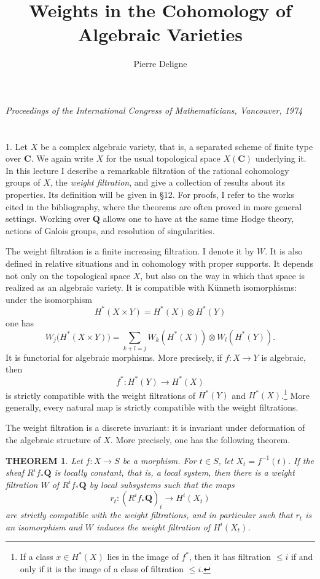 \documentclass[10pt]{amsart}
\title{Weights in the Cohomology of Algebraic Varieties}
\author{Pierre Deligne}
\theoremstyle{plain}
\newtheorem{theorem}{THEOREM}
\theoremstyle{definition}
\theoremstyle{remark}
\begin{document}
\maketitle

\begin{center}
\textit{Proceedings of the International Congress of Mathematicians, Vancouver, 1974}
\end{center}

\section*{}

1. Let $X$ be a complex algebraic variety, that is, a separated scheme of finite type over $\mathbf C$. We again write $X$ for the usual topological space $X(\mathbf C)$ underlying it. In this lecture I describe a remarkable filtration of the rational cohomology groups of $X$, the \textit{weight filtration}, and give a collection of results about its properties. Its definition will be given in \S 12. For proofs, I refer to the works cited in the bibliography, where the theorems are often proved in more general settings. Working over $\mathbf Q$ allows one to have at the same time Hodge theory, actions of Galois groups, and resolution of singularities.

The weight filtration is a finite increasing filtration. I denote it by $W$. It is also defined in relative situations and in cohomology with proper supports. It depends not only on the topological space $X$, but also on the way in which that space is realized as an algebraic variety. It is compatible with Künneth isomorphisms: under the isomorphism
\[
H^*(X\times Y)=H^*(X)\otimes H^*(Y)
\]
one has
\[
W_j\bigl(H^*(X\times Y)\bigr)=\sum_{k+l=j}W_k(H^*(X))\otimes W_l(H^*(Y)).
\]
It is functorial for algebraic morphisms. More precisely, if $f:X\to Y$ is algebraic, then
\[
f^*:H^*(Y)\to H^*(X)
\]
is strictly compatible with the weight filtrations of $H^*(Y)$ and $H^*(X)$.\footnote{If a class $x\in H^*(X)$ lies in the image of $f^*$, then it has filtration $\le i$ if and only if it is the image of a class of filtration $\le i$.} More generally, every natural map is strictly compatible with the weight filtrations.

The weight filtration is a discrete invariant: it is invariant under deformation of the algebraic structure of $X$. More precisely, one has the following theorem.

\begin{theorem}
Let $f:X\to S$ be a morphism. For $t\in S$, let $X_t=f^{-1}(t)$. If the sheaf $R^if_*\mathbf Q$ is locally constant, that is, a local system, then there is a weight filtration $W$ of $R^if_*\mathbf Q$ by local subsystems such that the maps
\[
r_t:(R^if_*\mathbf Q)_t\to H^i(X_t)
\]
are strictly compatible with the weight filtrations, and in particular such that $r_t$ is an isomorphism and $W$ induces the weight filtration of $H^i(X_t)$.
\end{theorem}
\end{document}
